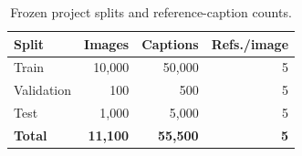 \begin{table}[htbp]
\centering
\caption{Frozen project splits and reference-caption counts.}
\label{tab:dataset-splits}
\begin{tabular}{@{}lrrr@{}}
\toprule
\textbf{Split} & \textbf{Images} & \textbf{Captions} & \textbf{Refs./image}\\
\midrule
Train & 10,000 & 50,000 & 5\\
Validation & 100 & 500 & 5\\
Test & 1,000 & 5,000 & 5\\
\midrule
\textbf{Total} & \textbf{11,100} & \textbf{55,500} & \textbf{5}\\
\bottomrule
\end{tabular}
\end{table}
